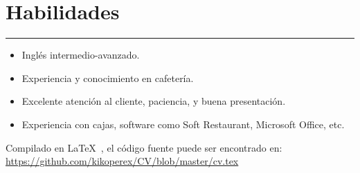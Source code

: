 \documentclass[10pt, a4paper]{article}
\begin{document}
\vspace{0.5cm}

\section*{\bfseries Habilidades}
\hrule
\vspace{0.2cm}
\begin{itemize}
    \item Inglés intermedio-avanzado.
    \item Experiencia y conocimiento en cafetería.
    \item Excelente atención al cliente, paciencia, y buena presentación.
    \item Experiencia con cajas, software como Soft Restaurant, Microsoft Office, etc.
\end{itemize}

\vspace{0.9cm}

Compilado en \LaTeX\ , el código fuente puede ser encontrado en: \\
\url{https://github.com/kikoperex/CV/blob/master/cv.tex}
 
\end{document}
